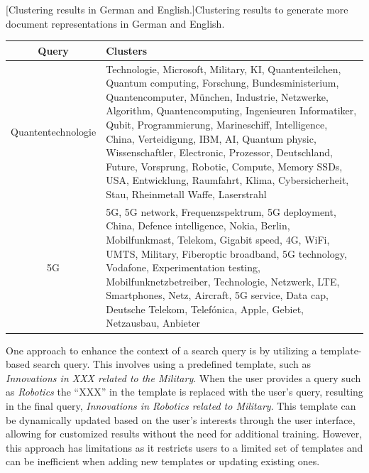 \begin{center}
	[Clustering results in German and English.]{Clustering results to generate more document representations in German and English.}\label{tab:clustering_100_output}
	\begin{tabularx}{.99\textwidth}{|c|Y|}
		\hline
		Query & Clusters \\
		\hline
		
		Quantentechnologie     & Technologie, Microsoft, Military, KI, Quantenteilchen, Quantum computing, Forschung, Bundesministerium, Quantencomputer, München, Industrie, Netzwerke, Algorithm, Quantencomputing, Ingenieuren Informatiker, Qubit, Programmierung, Marineschiff, Intelligence, China, Verteidigung, IBM, AI, Quantum physic, Wissenschaftler, Electronic, Prozessor, Deutschland, Future, Vorsprung, Robotic, Compute, Memory SSDs, USA, Entwicklung, Raumfahrt, Klima, Cybersicherheit, Stau, Rheinmetall Waffe, Laserstrahl \\  \hline
		
		5G          & 5G, 5G network, Frequenzspektrum, 5G deployment, China, Defence intelligence, Nokia, Berlin, Mobilfunkmast, Telekom, Gigabit speed, 4G, WiFi, UMTS, Military, Fiberoptic broadband, 5G technology, Vodafone, Experimentation testing, Mobilfunknetzbetreiber, Technologie, Netzwerk, LTE, Smartphones, Netz, Aircraft, 5G service, Data cap, Deutsche Telekom, Telefónica, Apple, Gebiet, Netzausbau, Anbieter \\  \hline
		
		
		
	\end{tabularx}
	
\end{center}


One approach to enhance the context of a search query is by utilizing a template-based search query. This involves using a predefined template, such as \emph{Innovations in XXX related to the Military}.  When the user provides a query such as \emph{Robotics} the ``XXX'' in the template is replaced with the user's query, resulting in the final query, \emph{Innovations in Robotics related to Military}. This template can be dynamically updated based on the user's interests through the user interface, allowing for customized results without the need for additional training. However, this approach has limitations as it restricts users to a limited set of templates and can be inefficient when adding new templates or updating existing ones.


